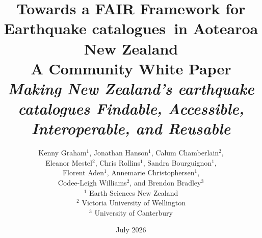 \documentclass[11pt]{article}
\newcommand{\catalogs}{catalogues}
\begin{document}
\linenumbers

 \title{Towards a FAIR Framework for Earthquake \catalogs\ in Aotearoa New Zealand \\[4pt] {\large A Community White Paper} \\[3pt] {\normalsize\itshape Making New Zealand's earthquake catalogues Findable, Accessible, Interoperable, and Reusable}}

 \author{
Kenny Graham$^{1}$,
Jonathan Hanson$^{1}$,
Calum Chamberlain$^{2}$, \\
Eleanor Mestel$^{2}$,
Chris Rollins$^{1}$,
Sandra Bourguignon$^{1}$, \\
Florent Aden$^{1}$,
Annemarie Christophersen$^{1}$, \\
Codee-Leigh Williams$^{2}$, and
Brendon Bradley$^{3}$ \\[1.5em]
$^{1}$ Earth Sciences New Zealand \\
$^{2}$ Victoria University of Wellington \\
$^{3}$ University of Canterbury
}


\date{July 2026}
\maketitle
\end{document}
